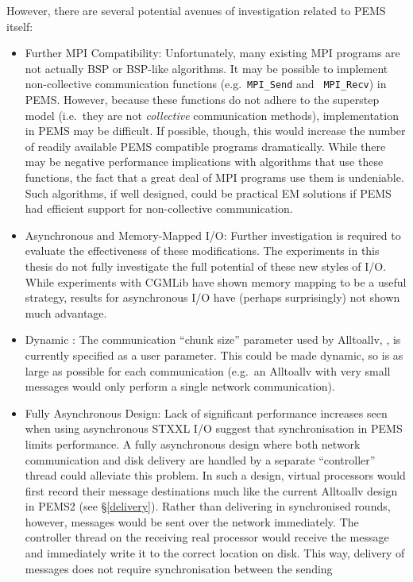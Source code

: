 \documentclass[12pt]{carletoncsthesis}
\begin{document}
However, there are several potential avenues of investigation related to
PEMS itself:
\begin{itemize}
\item Further MPI Compatibility: Unfortunately, many existing MPI programs are
not actually BSP or BSP-like algorithms.  It may be possible to implement
non-collective communication functions (e.g.\ {\tt MPI\_Send} and {\tt
MPI\_Recv}) in PEMS.  However, because these functions do not adhere to the
superstep model (i.e.\ they are not {\em collective} communication methods),
implementation in PEMS may be difficult.  If possible, though, this would
increase the number of readily available PEMS compatible programs dramatically.
While there may be negative performance implications with algorithms that
use these functions, the fact that a great deal of MPI programs use them
is undeniable.  Such algorithms, if well designed, could be practical EM
solutions if PEMS had efficient support for non-collective communication.
\item Asynchronous and Memory-Mapped I/O: Further investigation is required to
evaluate the effectiveness of these modifications.  The experiments in this
thesis do not fully investigate the full potential of these new styles of I/O.
While experiments with CGMLib have shown memory mapping to be a useful strategy,
results for asynchronous I/O have (perhaps surprisingly) not shown much advantage.
\item Dynamic : The communication ``chunk size'' parameter used by
Alltoallv, , is currently specified as a user parameter.  This could be
made dynamic, so  is as large as possible for each communication (e.g.\
an Alltoallv with very small messages would only perform a single network communication).
\item Fully Asynchronous Design: Lack of significant performance increases seen
when using asynchronous STXXL I/O suggest that synchronisation in PEMS limits
performance.  A fully asynchronous design where both network communication
and disk delivery are handled by a separate ``controller'' thread could
alleviate this problem.  In such a design, virtual processors would first
record their message destinations much like the current Alltoallv design
in PEMS2 (see \S\ref{delivery}).  Rather than delivering in synchronised
rounds, however, messages would be sent over the network immediately.
The controller thread on the receiving real processor would receive the
message and immediately write it to the correct location on disk.  This way,
delivery of messages does not require synchronisation between the sending

\end{itemize}
\end{document}
